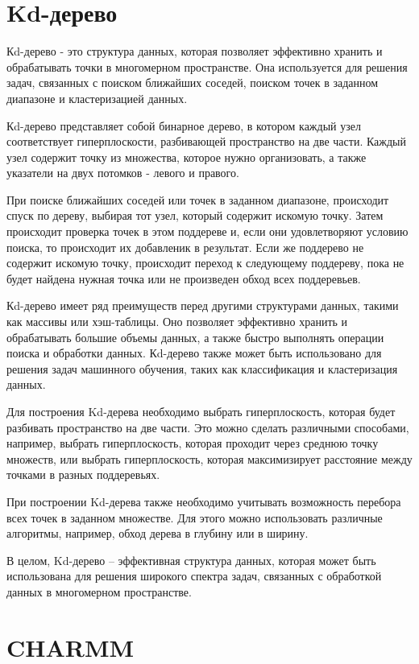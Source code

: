 \section{Kd-дерево}


Кd-дерево - это структура данных, которая позволяет эффективно хранить и обрабатывать точки в многомерном пространстве. Она используется для решения задач, связанных с поиском ближайших соседей, поиском точек в заданном диапазоне и кластеризацией данных.

Кd-дерево представляет собой бинарное дерево, в котором каждый узел соответствует гиперплоскости, разбивающей пространство на две части. Каждый узел содержит точку из множества, которое нужно организовать, а также указатели на двух потомков - левого и правого.

При поиске ближайших соседей или точек в заданном диапазоне, происходит спуск по дереву, выбирая тот узел, который содержит искомую точку. Затем происходит проверка точек в этом поддереве и, если они удовлетворяют условию поиска, то происходит их добавленик в результат. Если же поддерево не содержит искомую точку, происходит переход к следующему поддереву, пока не будет найдена нужная точка или не произведен обход всех поддеревьев.

Кd-дерево имеет ряд преимуществ перед другими структурами данных, такими как массивы или хэш-таблицы. Оно позволяет эффективно хранить и обрабатывать большие объемы данных, а также быстро выполнять операции поиска и обработки данных. Кd-дерево также может быть использовано для решения задач машинного обучения, таких как классификация и кластеризация данных.

Для построения Kd-дерева необходимо выбрать гиперплоскость, которая будет разбивать пространство на две части. Это можно сделать различными способами, например, выбрать гиперплоскость, которая проходит через среднюю точку множеств, или выбрать гиперплоскость, которая максимизирует расстояние между точками в разных поддеревьях.

При построении Kd-дерева также необходимо учитывать возможность перебора всех точек в заданном множестве. Для этого можно использовать различные алгоритмы, например, обход дерева в глубину или в ширину.

В целом, Kd-дерево -- эффективная структура данных, которая может быть использована для решения широкого спектра задач, связанных с обработкой данных в многомерном пространстве.

\section{CHARMM}

